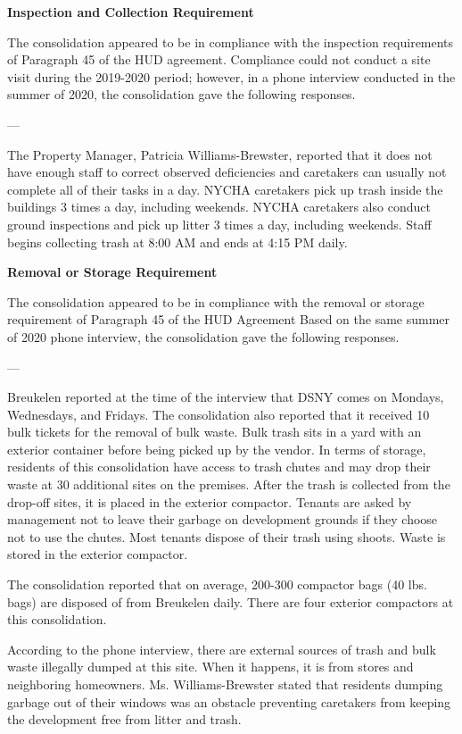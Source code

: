 

\textbf{Inspection and Collection Requirement}

The consolidation appeared to be in compliance with the inspection requirements of Paragraph 45 of the HUD agreement. Compliance could not conduct a site visit during the 2019-2020 period; however, in a phone interview conducted in the summer of 2020, the consolidation gave the following responses.

---

The Property Manager, Patricia Williams-Brewster, reported that it does not have enough staff to correct observed deficiencies and caretakers can usually not complete all of their tasks in a day. NYCHA caretakers pick up trash inside the buildings 3 times a day, including weekends. NYCHA caretakers also conduct ground inspections and pick up litter 3 times a day, including weekends. Staff begins collecting trash at 8:00 AM and ends at 4:15 PM daily.

\textbf{Removal or Storage Requirement}

The consolidation appeared to be in compliance with the  removal or storage requirement of Paragraph  45 of the HUD  Agreement Based on the same summer of  2020 phone interview, the consolidation gave the following responses.

---

Breukelen reported at the time of the interview that DSNY comes on Mondays, Wednesdays, and Fridays. The consolidation also reported that it received 10 bulk tickets for the removal of bulk waste. Bulk trash sits in a yard with an exterior container before being picked up by the vendor. In terms of storage, residents of this consolidation have access to trash chutes and may drop their waste at 30 additional sites on the premises. After the trash is collected from the drop-off sites, it is placed in the exterior compactor. Tenants are asked by management not to leave their garbage on development grounds if they choose not to use the chutes. Most tenants dispose of their trash using shoots. Waste is stored in the exterior compactor. 

The consolidation reported that on average, 200-300 compactor bags (40 lbs. bags) are disposed of from Breukelen daily. There are four exterior compactors at this consolidation. 

According to the phone interview, there are external sources of trash and bulk waste illegally dumped at this site. When it happens, it is from stores and neighboring homeowners. Ms. Williams-Brewster stated that residents dumping garbage out of their windows was an obstacle preventing caretakers from keeping the development free from litter and trash.